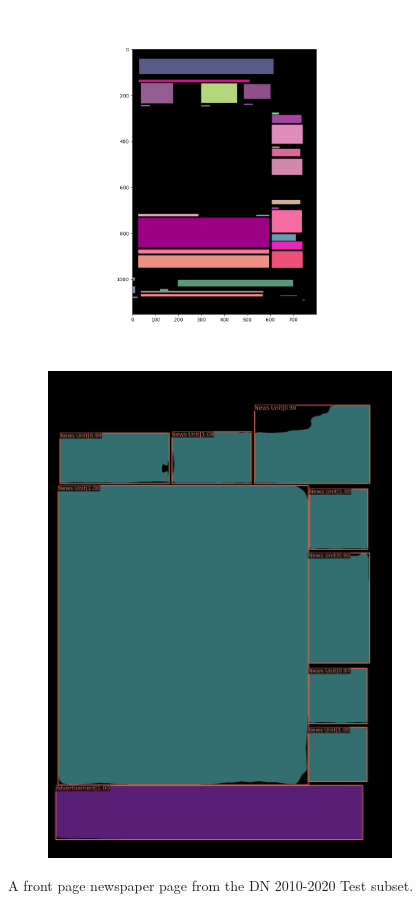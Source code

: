 \documentclass[aspectratio=1610]{beamer}
\begin{document}
\begin{frame}
  \begin{figure}
\centering
\begin{subfigure}{.5\textwidth}
  \centering
  \includegraphics[width=0.7\linewidth, clip=true, trim = 50mm 20mm 60mm 0mm]{figures/tf/JIefsDa.png}
\end{subfigure}%
\begin{subfigure}{.5\textwidth}
  \centering
  \includegraphics[width=0.7\linewidth, clip=true, trim = 0mm 0mm 0mm 0mm]{figures/labels-vanilla-0.75/JIefsDa.jpg}
\end{subfigure}
\caption{A front page newspaper page from the DN 2010-2020 Test subset.}
\label{fig:front}
\end{figure}

\end{frame}
\normalpage
\end{document}

